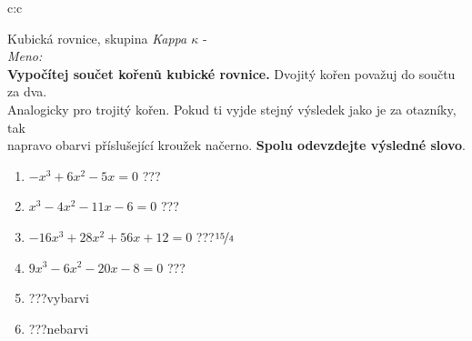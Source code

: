 \documentclass[10pt]{report}
\begin{document}
\clearpage
\thispagestyle{empty}
\begin{tabular}{c:c}
\begin{minipage}[c][99mm][t]{0.49\linewidth}
\begin{center}
\vspace{7mm}
{\huge Kubická rovnice, skupina \textit{Kappa $\kappa$} -}\\[4.5mm]
\textit{Meno:}\phantom{xxxxxxxxxxxxxxxxxxxxxxxxxxxxxxxxxxxxxxxxxxxxxxxxxxxxxxxxxxxxxxxxx}\\[3.5mm]
\textbf{Vypočítej součet kořenů kubické rovnice.} Dvojitý kořen považuj do součtu za dva.\\Analogicky pro trojitý kořen. Pokud ti vyjde stejný výsledek jako je za otazníky, tak\\napravo obarvi příslušející kroužek načerno. \textbf{Spolu odevzdejte výsledné slovo}.\\[3mm]
\begin{minipage}{0.77\linewidth}
\begin{center}
\begin{varwidth}{\textwidth}
\begin{enumerate}
\large
\item $-x^3+6x^2-5x=0$\quad \dotfill\; ???\;\dotfill {}
\item $x^3-4x^2-11x-6=0$\quad \dotfill\; ???\;\dotfill {}
\item $-16x^3+28x^2+56x+12=0$\quad \dotfill\; ???\;\dotfill \quad $\nicefrac{15}{4}$
\item $9x^3-6x^2-20x-8=0$\quad \dotfill\; ???\;\dotfill {}
\item \quad \dotfill\; ???\;\dotfill \quad vybarvi
\item \quad \dotfill\; ???\;\dotfill \quad nebarvi
\end{enumerate}
\end{varwidth}
\end{center}
\end{minipage}
\begin{minipage}{0.20\linewidth}
\begin{center}

\end{center}
\end{minipage}
\end{center}
\end{minipage}
\end{tabular}
\end{document}
